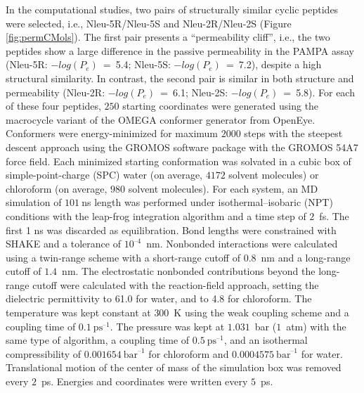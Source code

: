In the computational studies, two pairs of structurally similar cyclic peptides were selected, i.e., Nleu-5R/Nleu-5S and Nleu-2R/Nleu-2S (Figure \ref{fig:permCMols}). 
The first pair presents a ``permeability cliff'', i.e., the two peptides show a large difference in the passive permeability in the PAMPA assay (Nleu-5R: $−log(P_e)$~=~5.4; Nleu-5S: $−log(P_e)$~=~7.2), despite a high structural similarity. 
In contrast, the second pair is similar in both structure and permeability (Nleu-2R: $−log(P_e)$~=~6.1; Nleu-2S: $−log(P_e)$~=~5.8). 
For each of these four peptides, $250$ starting coordinates were generated using the macrocycle variant of the OMEGA conformer generator from OpenEye. \cite{Hawkins2012, Hawkins2010, Poongavanam2018}
Conformers were energy-minimized for maximum $2000$ steps with the steepest descent \cite{Ruder2016} approach using the GROMOS software package \cite{Schmid2012} with the GROMOS 54A7 force field. \cite{Schmid2011} 
Each minimized starting conformation was solvated in a cubic box of simple-point-charge (SPC) water \cite{Berendsen1981} (on average, $4172$ solvent molecules) or chloroform \cite{Tironi1994} (on average, $980$ solvent molecules). 
For each system, an MD simulation of $101~$ns length was performed under isothermal–isobaric (NPT) conditions with the leap-frog integration algorithm \cite{Hockney1970, Gunsteren1988} and a time step of $2$~fs. 
The first 1 ns was discarded as equilibration. Bond lengths were constrained with SHAKE \cite{Ryckaert1977} and a tolerance of $10^{–4}$~nm. 
Nonbonded interactions were calculated using a twin-range scheme with a short-range cutoff of $0.8$~nm and a long-range cutoff of $1.4$~nm. 
The electrostatic nonbonded contributions beyond the long-range cutoff were calculated with the reaction-field \cite{Tironi1995} approach, setting the dielectric permittivity to 61.0 \cite{Heinz2001} for water, and to 4.8 \cite{Tironi1994} for chloroform. 
The temperature was kept constant at $300$~K using the weak coupling scheme \cite{Berendsen1984} and a coupling time of $0.1~\text{ps}^{–1}$. 
The pressure was kept at $1.031$~bar ($1$~atm) with the same type of algorithm, a coupling time of $0.5~\text{ps}^{–1}$, and an isothermal compressibility of $0.001654~\text{bar}^{–1}$ for chloroform and $0.0004575~\text{bar}^{–1}$ for water. 
Translational motion of the center of mass of the simulation box was removed every $2$~ps. Energies and coordinates were written every $5$~ps.

